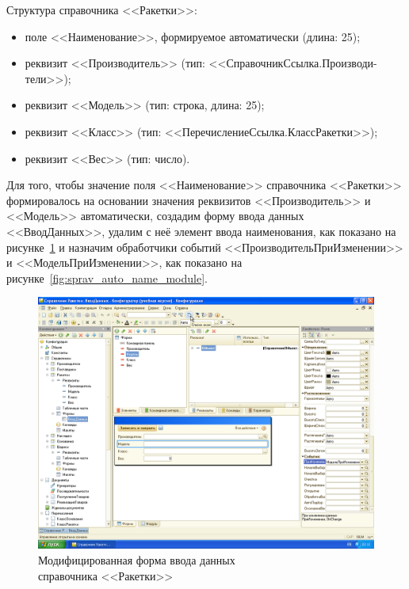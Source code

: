 \pagebreak

Структура справочника <<Ракетки>>:
\begin{itemize}
\item поле <<Наименование>>, формируемое автоматически (длина: 25);
\item реквизит <<Производитель>> (тип: <<СправочникСсылка.Производи-тели>>);
\item реквизит <<Модель>> (тип: строка, длина: 25);
\item реквизит <<Класс>> (тип: <<ПеречислениеСсылка.КлассРакетки>>);
\item реквизит <<Вес>> (тип: число).
\end{itemize}

Для того, чтобы значение поля <<Наименование>> справочника <<Ракетки>>
формировалось на основании значения реквизитов <<Производитель>> и <<Модель>>
автоматически, создадим форму ввода данных <<ВводДанных>>,
удалим с неё элемент ввода наименования, как показано на
рисунке~\ref{fig:sprav_auto_name} и назначим обработчики событий
<<ПроизводительПриИзменении>> и <<МодельПриИзменении>>,
как показано на рисунке~\ref{fig:sprav_auto_name_module}.

\begin{figure}[h!]
  \centering
  \includegraphics[width=130mm]{pic/sprav_auto_name}
  \caption{Модифицированная форма ввода данных \\ справочника <<Ракетки>>}
  \label{fig:sprav_auto_name}
\end{figure}

